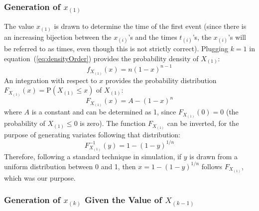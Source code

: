 \documentclass[12pt]{article} %
\begin{document}
\subsubsection{Generation of $x_{(1)}$}
The value $x_{(1)}$ is drawn to determine the time of the first event (since there is an increasing bijection between the $x_{(i)}$'s and the times $t_{(i)}$'s, the $x_{(i)}$'s will be referred to as times, even though this is not strictly correct). Plugging $k=1$ in equation~(\ref{eq:densityOrder}) provides the probability density of $X_{(1)}$:
\begin{equation}
f_{X_{(1)}}(x) = n (1-x)^{n-1}
\end{equation}
An integration with respect to $x$ provides the probability distribution $F_{X_{(1)}}(x)=\text{P}(X_{(1)}\leq x)$ of $X_{(1)}$:
\begin{equation}
F_{X_{(1)}}(x) = A - (1-x)^{n}
\end{equation}
where $A$ is a constant and can be determined as 1, since $F_{X_{(1)}}(0)=0$ (the probability of $X_{(1)} \leq 0$ is zero). The function $F_{X_{(1)}}$ can be inverted, for the purpose of generating variates following that distribution:
\begin{equation}\label{eq:initgeneration}
F^{-1}_{X_{(1)}} (y) = 1 - (1-y)^{1/n}
\end{equation}
Therefore, following a standard technique in simulation, if $y$ is drawn from a uniform distribution between 0 and 1, then $x=1 - (1-y)^{1/n}$ follows $F_{X_{(1)}}$, which was our purpose.
%
%
\subsubsection{Generation of $x_{(k)}$ Given the Value of $X_{(k-1)}$}
\end{document}
